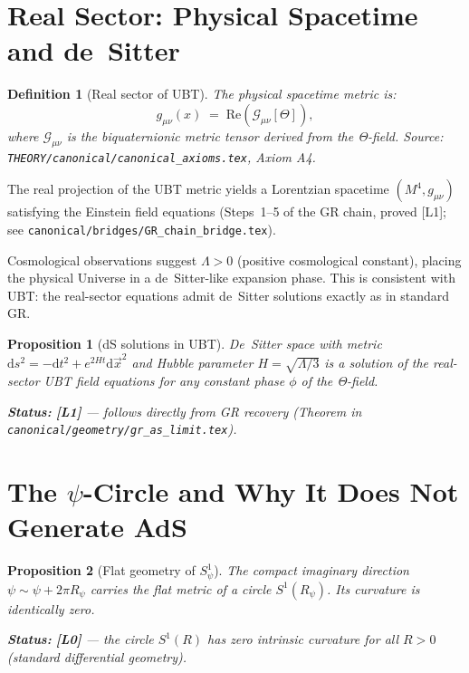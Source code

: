 \documentclass[11pt,a4paper]{article}
\newtheorem{proposition}{Proposition}
\newtheorem{definition}{Definition}
\begin{document}
\section{Real Sector: Physical Spacetime and de~Sitter}
\label{sec:real_sector}

\begin{definition}[Real sector of UBT]
The physical spacetime metric is:
\begin{equation}
  g_{\mu\nu}(x) \;=\; \mathrm{Re}\!\left(\mathcal{G}_{\mu\nu}[\Theta]\right),
\end{equation}
where $\mathcal{G}_{\mu\nu}$ is the biquaternionic metric tensor derived from the
Θ-field. Source: \texttt{THEORY/canonical/canonical\_axioms.tex}, Axiom A4.
\end{definition}

The real projection of the UBT metric yields a Lorentzian spacetime $(M^4, g_{\mu\nu})$
satisfying the Einstein field equations (Steps~1--5 of the GR chain, proved [L1];
see \texttt{canonical/bridges/GR\_chain\_bridge.tex}).

Cosmological observations suggest $\Lambda > 0$ (positive cosmological constant),
placing the physical Universe in a de~Sitter-like expansion phase. This is consistent
with UBT: the real-sector equations admit de~Sitter solutions exactly as in standard
GR.

\begin{proposition}[dS solutions in UBT]\label{prop:dS}
De~Sitter space with metric $\mathrm{d}s^2 = -\mathrm{d}t^2 + e^{2Ht}\mathrm{d}\vec{x}^2$
and Hubble parameter $H = \sqrt{\Lambda/3}$ is a solution of the real-sector
UBT field equations for any constant phase $\phi$ of the Θ-field.

\noindent\textbf{Status:} \textbf{[L1]} — follows directly from GR recovery
(Theorem in \texttt{canonical/geometry/gr\_as\_limit.tex}).
\end{proposition}

\section{The $\psi$-Circle and Why It Does Not Generate AdS}
\label{sec:psi_circle}

\begin{proposition}[Flat geometry of $S^1_\psi$]\label{prop:flat_circle}
The compact imaginary direction $\psi \sim \psi + 2\pi R_\psi$ carries the flat
metric of a circle $S^1(R_\psi)$. Its curvature is identically zero.

\noindent\textbf{Status:} \textbf{[L0]} — the circle $S^1(R)$ has zero intrinsic
curvature for all $R > 0$ (standard differential geometry).
\end{proposition}
\end{document}
